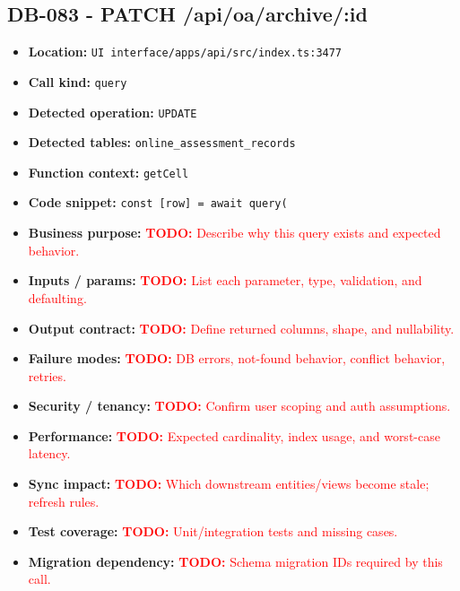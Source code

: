 \documentclass[11pt]{article}
\newcommand{\todoitem}[1]{\textcolor{red}{\textbf{TODO:} #1}}
\begin{document}
\subsection{DB-083 - PATCH /api/oa/archive/:id}
\begin{itemize}[leftmargin=1.5em]
\item \textbf{Location:} \texttt{UI interface/apps/api/src/index.ts:3477}
\item \textbf{Call kind:} \texttt{query}
\item \textbf{Detected operation:} \texttt{UPDATE}
\item \textbf{Detected tables:} \texttt{online\_assessment\_records}
\item \textbf{Function context:} \texttt{getCell}
\item \textbf{Code snippet:} \texttt{const [row] = await query(}
\item \textbf{Business purpose:} \todoitem{Describe why this query exists and expected behavior.}
\item \textbf{Inputs / params:} \todoitem{List each parameter, type, validation, and defaulting.}
\item \textbf{Output contract:} \todoitem{Define returned columns, shape, and nullability.}
\item \textbf{Failure modes:} \todoitem{DB errors, not-found behavior, conflict behavior, retries.}
\item \textbf{Security / tenancy:} \todoitem{Confirm user scoping and auth assumptions.}
\item \textbf{Performance:} \todoitem{Expected cardinality, index usage, and worst-case latency.}
\item \textbf{Sync impact:} \todoitem{Which downstream entities/views become stale; refresh rules.}
\item \textbf{Test coverage:} \todoitem{Unit/integration tests and missing cases.}
\item \textbf{Migration dependency:} \todoitem{Schema migration IDs required by this call.}
\end{itemize}
\end{document}
